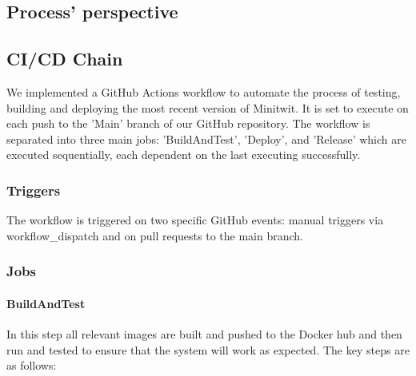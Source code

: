 \documentclass[12pt, a4paper, oneside]{book}
\begin{document}
\begin{spacing}{1.5}
\chapter{Process' perspective}

\section{CI/CD Chain}
We implemented a GitHub Actions workflow to automate the process of testing, building and deploying the most recent version of Minitwit. It is set to execute on each push to the 'Main' branch of our GitHub repository. The workflow is separated into three main jobs: 'BuildAndTest', 'Deploy', and 'Release' which are executed sequentially, each dependent on the last executing successfully.

\subsection{Triggers}
The workflow is triggered on two specific GitHub events: manual triggers via workflow\_dispatch and on pull requests to the main branch. 

\subsection{Jobs}
\subsubsection{BuildAndTest}
In this step all relevant images are built and pushed to the Docker hub and then run and tested to ensure that the system will work as expected. The key steps are as follows:


\end{spacing}
\end{document}
